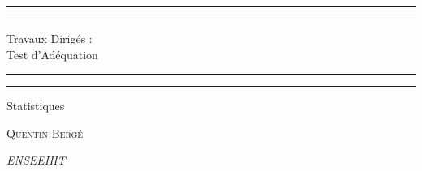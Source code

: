 \documentclass[a4paper,oneside]{article}
\begin{document}
\begin{titlepage} %

	\centering %

	\scshape %

	\vspace*{\baselineskip} %


	\rule{\textwidth}{1.6pt}\vspace*{-\baselineskip}\vspace*{2pt}
	\rule{\textwidth}{0.4pt} %

	\vspace{0.75\baselineskip} %

	{\LARGE Travaux Dirigés :\\
	\vspace{0.75\baselineskip}
	Test d'Adéquation\\
	} %

	\vspace{1\baselineskip} %
	\rule{\textwidth}{0.4pt}\vspace*{-\baselineskip}\vspace*{3.2pt}
	\rule{\textwidth}{1.6pt} %
	\vspace{2\baselineskip} %


	Statistiques

	\vspace*{3\baselineskip} %



	\vspace{0.5\baselineskip} %

	{\scshape\Large Quentin Bergé \\} %

	\vspace{0.5\baselineskip} %

	\textit{ENSEEIHT} %


\end{titlepage}
\end{document}
